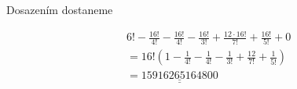 \documentclass[12pt]{article}
\begin{document}
\begin{enumerate}
    Dosazením dostaneme

    \begin{align*}
      &6! - \frac{16!}{4!} - \frac{16!}{4!} - \frac{16!}{3!} + \frac{12\cdot16!}{7!} + \frac{16!}{5!} + 0 \\
      &= 16! (1 - \frac{1}{4!} - \frac{1}{4!} - \frac{1}{3!} + \frac{12}{7!} + \frac{1}{5!}) \\
      &= \underline{\underline{15916265164800}}
    \end{align*}
\end{enumerate}
\end{document}
